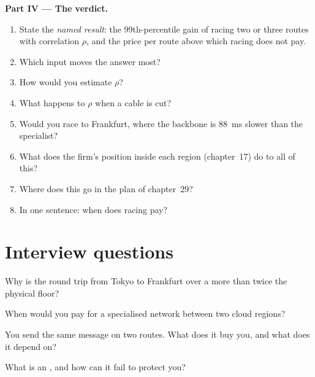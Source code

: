 \begin{problem}
\medskip\noindent\textbf{Part IV --- The verdict.}
\begin{enumerate}[resume]
\item State the \emph{named result}: the 99th-percentile gain of racing two or three routes with correlation $\rho$, and the price per route above which
  racing does not pay.
\item Which input moves the answer most?
\item How would you estimate $\rho$?
\item What happens to $\rho$ when a cable is cut?
\item Would you race to Frankfurt, where the backbone is 88~ms slower than the specialist?
\item What does the firm's position inside each region (chapter~17) do to all of this?
\item Where does this go in the plan of chapter~29?
\item In one sentence: when does racing pay?
\end{enumerate}
\end{problem}

\section{Interview questions}

\begin{interviewq}\label{iq:nw:cross-region-crypto-networks:1}
Why is the round trip from Tokyo to Frankfurt over a  more than twice the physical floor?
\end{interviewq}

\begin{interviewq}\label{iq:nw:cross-region-crypto-networks:2}
When would you pay for a specialised network between two cloud regions?
\end{interviewq}

\begin{interviewq}\label{iq:nw:cross-region-crypto-networks:3}
You send the same message on two routes. What does it buy you, and what does it depend on?
\end{interviewq}

\begin{interviewq}\label{iq:nw:cross-region-crypto-networks:4}
What is an , and how can it fail to protect you?
\end{interviewq}

